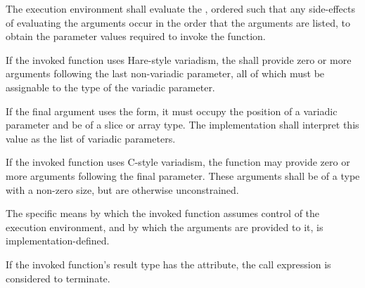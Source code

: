 \specsubsubitem
The execution environment shall evaluate the ,
ordered such that any side-effects of evaluating the arguments occur in the
order that the arguments are listed, to obtain the parameter values required to
invoke the function.

\specsubsubitem
If the invoked function uses Hare-style variadism, the
 shall provide zero or more arguments following the
last non-variadic parameter, all of which must be assignable to the type of the
variadic parameter.

\specsubsubitem
If the final argument uses the  form, it must occupy the position of a
variadic parameter and be of a slice or array type. The implementation shall
interpret this value as the list of variadic parameters.

\specsubsubitem
If the invoked function uses C-style variadism, the function may provide zero
or more arguments following the final parameter. These arguments shall be of a
type with a non-zero size, but are otherwise unconstrained.

\specsubsubitem
The specific means by which the invoked function assumes control of the
execution environment, and by which the arguments are provided to it, is
implementation-defined.


\specsubsubitem
If the invoked function's result type has the  attribute,
the call expression is considered to terminate.


\begin{grammar}
 \\
	 \\
	 \\
	 \\

 \\
	 \terminal{(}  \terminal{)} \\

 \\
	 \terminal{(}  \terminal{)} \\

 \\
	 \terminal{(}  \terminal{)} \\
\end{grammar}

